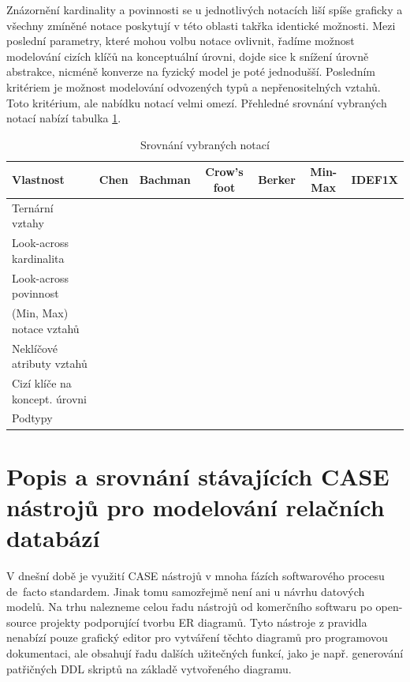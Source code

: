 \documentclass[czech,bachelor,public,dept460,male,oneside]{diploma}
\newcommand{\xmark}{\ding{55}}
\newcommand{\cmark}{\ding{51}}
\begin{document}
	Znázornění kardinality a povinnosti se u jednotlivých notacích liší spíše graficky a všechny zmíněné notace poskytují v této oblasti takřka identické možnosti. Mezi poslední parametry, které mohou volbu notace ovlivnit, řadíme možnost modelování cizích klíčů na konceptuální úrovni, dojde sice k snížení úrovně abstrakce, nicméně konverze na fyzický model je poté jednodušší. Posledním kritériem je možnost modelování odvozených typů a nepřenositelných vztahů. Toto kritérium, ale nabídku notací velmi omezí. Přehledné srovnání vybraných notací nabízí tabulka \ref{tab:notationCmp}.
	
	\begin{table}[h!]
		\centering
		\caption{Srovnání vybraných notací}
		\label{tab:notationCmp}
		\begin{tabular}{l c c c c c c}
			\toprule
			Vlastnost & Chen & Bachman & Crow's foot & Berker & Min-Max & IDEF1X \\
			\midrule
			Ternární vztahy & \cmark & \xmark & \xmark & \xmark & \xmark & \xmark \\
			Look-across kardinalita & \cmark & \cmark & \cmark & \cmark & \xmark & \cmark \\
			Look-across povinnost & \xmark & \xmark & \cmark & \xmark & \xmark & \cmark \\
			(Min, Max) notace vztahů & \xmark & \xmark & \cmark & \xmark & \cmark & \cmark \\
			Neklíčové atributy vztahů & \cmark & \xmark & \xmark & \xmark & \xmark & \xmark \\
			Cizí klíče na koncept. úrovni & \xmark & \cmark & \xmark & \xmark & \xmark & \cmark \\
			Podtypy & \cmark & \cmark & \cmark & \cmark & \cmark & \xmark \\
			\midrule
		\end{tabular}
	\end{table}

\newpage
\section{Popis a srovnání stávajících CASE nástrojů pro modelování relačních databází}
V dnešní době je využití CASE nástrojů v mnoha fázích softwarového procesu de~facto standardem. Jinak tomu samozřejmě není ani u návrhu datových modelů. Na trhu nalezneme celou řadu nástrojů od komerčního softwaru po open-source projekty podporující tvorbu ER diagramů. Tyto nástroje z pravidla nenabízí pouze grafický editor pro vytváření těchto diagramů pro programovou dokumentaci, ale obsahují řadu dalších užitečných funkcí, jako je např. generování patřičných DDL skriptů na základě vytvořeného diagramu.
	
\end{document}
